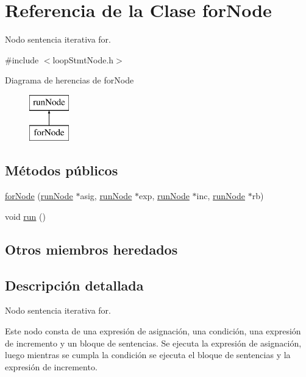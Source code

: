 \hypertarget{classforNode}{\section{Referencia de la Clase for\-Node}
\label{classforNode}
}


Nodo sentencia iterativa for.  




{\ttfamily \#include $<$loop\-Stmt\-Node.\-h$>$}

Diagrama de herencias de for\-Node\begin{figure}[H]
\begin{center}
\leavevmode
\includegraphics[height=2.000000cm]{classforNode}
\end{center}
\end{figure}
\subsection*{Métodos públicos}
\begin{DoxyCompactItemize}
\item 
\hyperlink{classforNode_a1a300d8edd6016fe323b3bf4ec2f34fc}{for\-Node} (\hyperlink{classrunNode}{run\-Node} $\ast$asig, \hyperlink{classrunNode}{run\-Node} $\ast$exp, \hyperlink{classrunNode}{run\-Node} $\ast$inc, \hyperlink{classrunNode}{run\-Node} $\ast$rb)
\item 
void \hyperlink{classforNode_aaec3e2c55e856503df16c17c1ae1f254}{run} ()
\end{DoxyCompactItemize}
\subsection*{Otros miembros heredados}


\subsection{Descripción detallada}
Nodo sentencia iterativa for. 

Este nodo consta de una expresión de asignación, una condición, una expresión de incremento y un bloque de sentencias. Se ejecuta la expresión de asignación, luego mientras se cumpla la condición se ejecuta el bloque de sentencias y la expresión de incremento. 

